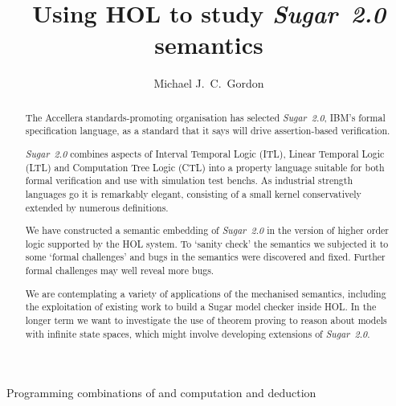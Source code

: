 \documentclass{llncs}
\newcommand\Sugar{{\it{Sugar~2.0}}\xspace}
\newcommand\Hol{HOL\xspace}
\begin{document}
\pagestyle{headings}                  %

\title{Using HOL to study \Sugar semantics}

\titlerunning%
{Programming combinations of%
and computation and deduction}        %
 

\author{Michael J.~C.~Gordon}



\maketitle                            %

\vspace*{-3mm}

\begin{abstract}
The Accellera standards-promoting organisation has selected \Sugar,
IBM's formal specification language, as a standard that it says will
drive assertion-based verification.

\Sugar combines aspects of Interval Temporal Logic (ITL), Linear
Temporal Logic (LTL) and Computation Tree Logic (CTL) into a property
language suitable for both formal verification and use with simulation
test benchs. As industrial strength languages go it is remarkably
elegant, consisting of a small kernel conservatively extended by
numerous definitions.

We have constructed a semantic embedding of \Sugar in the version of
higher order logic supported by the \Hol system. To `sanity check' the
semantics we subjected it to some `formal challenges' and bugs in the
semantics were discovered and fixed. Further formal challenges may
well reveal more bugs.

We are contemplating a variety of applications of the mechanised
semantics, including the exploitation of existing work to build a
Sugar model checker inside \Hol. In the longer term we want to
investigate the use of theorem proving to reason about models with
infinite state spaces, which might involve developing extensions of
\Sugar.
\end{abstract}
\end{document}
